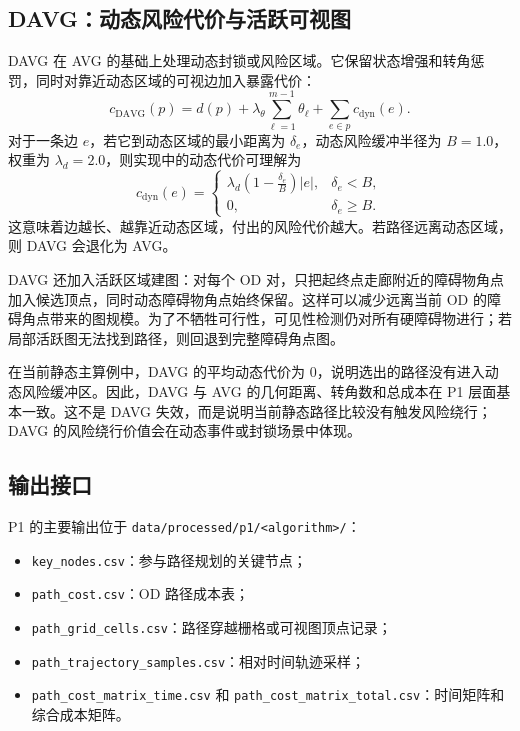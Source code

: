 \subsection{DAVG：动态风险代价与活跃可视图}

DAVG 在 AVG 的基础上处理动态封锁或风险区域。它保留状态增强和转角惩罚，同时对靠近动态区域的可视边加入暴露代价：
\[
  c_{\mathrm{DAVG}}(p)=d(p)+\lambda_\theta\sum_{\ell=1}^{m-1}\theta_\ell
  +\sum_{e\in p} c_{\mathrm{dyn}}(e).
\]
对于一条边 $e$，若它到动态区域的最小距离为 $\delta_e$，动态风险缓冲半径为 $B=1.0$，权重为 $\lambda_d=2.0$，则实现中的动态代价可理解为
\[
  c_{\mathrm{dyn}}(e)=
  \begin{cases}
    \lambda_d\left(1-\frac{\delta_e}{B}\right)|e|, & \delta_e<B,\\
    0, & \delta_e\ge B.
  \end{cases}
\]
这意味着边越长、越靠近动态区域，付出的风险代价越大。若路径远离动态区域，则 DAVG 会退化为 AVG。

DAVG 还加入活跃区域建图：对每个 OD 对，只把起终点走廊附近的障碍物角点加入候选顶点，同时动态障碍物角点始终保留。这样可以减少远离当前 OD 的障碍角点带来的图规模。为了不牺牲可行性，可见性检测仍对所有硬障碍物进行；若局部活跃图无法找到路径，则回退到完整障碍角点图。

在当前静态主算例中，DAVG 的平均动态代价为 0，说明选出的路径没有进入动态风险缓冲区。因此，DAVG 与 AVG 的几何距离、转角数和总成本在 P1 层面基本一致。这不是 DAVG 失效，而是说明当前静态路径比较没有触发风险绕行；DAVG 的风险绕行价值会在动态事件或封锁场景中体现。



\subsection{输出接口}

P1 的主要输出位于 \verb|data/processed/p1/<algorithm>/|：

\begin{itemize}
  \item \verb|key_nodes.csv|：参与路径规划的关键节点；
  \item \verb|path_cost.csv|：OD 路径成本表；
  \item \verb|path_grid_cells.csv|：路径穿越栅格或可视图顶点记录；
  \item \verb|path_trajectory_samples.csv|：相对时间轨迹采样；
  \item \verb|path_cost_matrix_time.csv| 和 \verb|path_cost_matrix_total.csv|：时间矩阵和综合成本矩阵。
\end{itemize}

